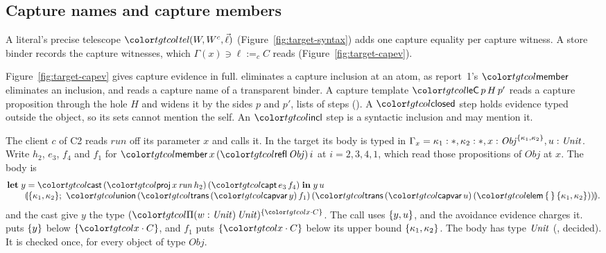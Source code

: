 \subsection{Capture names and capture members}\label{sec:target-members}

A literal's precise telescope $\ofLit{W, W^{c}}{\vec{\ell}}$ (Figure~\ref{fig:target-syntax}) adds one capture equality per capture witness. A store binder records the capture witnesses, which $\Gamma(x) \ni \ell \mathrel{:=_{c}} C$ reads (Figure~\ref{fig:target-capev}).

Figure~\ref{fig:target-capev} gives capture evidence in full.  eliminates a capture inclusion at an atom, as report~1's $\ev{member}$ eliminates an inclusion, and  reads a capture name of a transparent binder. A capture template $\ev{leC}\,p\,H\,p'$ reads a capture proposition through the hole $H$ and widens it by the sides $p$ and $p'$, lists of steps (). A $\ev{closed}$ step holds evidence typed outside the object, so its sets cannot mention the self. An $\ev{incl}$ step is a syntactic inclusion and may mention it.

\begin{example}\label{ex:target-client}
The client $c$ of C2 reads $\mathit{run}$ off its parameter $x$ and calls it. In the target its body is typed in $\Gamma_x = \kappa_1 : \ast, \kappa_2 : \ast, x : \mathit{Obj}^{\{\kappa_1,\kappa_2\}}, u : \mathit{Unit}$. Write $h_2$, $e_3$, $f_4$ and $f_1$ for $\ev{member}\,x\,(\ev{refl}\,\mathit{Obj})\,i$ at $i = 2, 3, 4, 1$, which read those propositions of $\mathit{Obj}$ at $x$. The body is
\[
\begin{array}{@{}l@{}}
\klet y = \ev{cast}\,(\ev{proj}\,x\,\mathit{run}\,h_2)\,(\ev{capt}\,e_3\,f_4) \kin y\,u \\
\qquad \ann{\cset{\kappa_1,\kappa_2};\ \ev{union}\,(\ev{trans}\,(\ev{capvar}\,y)\,f_1)\,(\ev{trans}\,(\ev{capvar}\,u)\,(\ev{elem}\,\cempty\,\cset{\kappa_1,\kappa_2}))} .
\end{array}
\]
 and the cast give $y$ the type $\capt{(\pit[w]{\Unit}{\Unit})}{\cset{\sel{x}{C}}}$. The call uses $\{y, u\}$, and the avoidance evidence charges it.  puts $\{y\}$ below $\cset{\sel{x}{C}}$, and $f_1$ puts $\cset{\sel{x}{C}}$ below its upper bound $\{\kappa_1,\kappa_2\}$. The body has type $\mathit{Unit}$ (, decided). It is checked once, for every object of type $\mathit{Obj}$.
\end{example}


